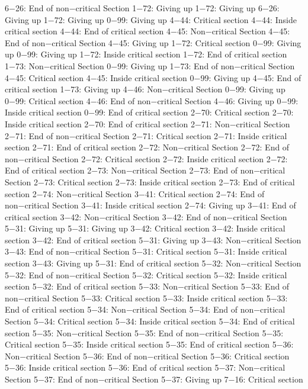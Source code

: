 6−26: End of non−critical Section
1−72: Giving up
1−72: Giving up
6−26: Giving up
1−72: Giving up
0−99: Giving up
4−44: Critical section
4−44: Inside critical section
4−44: End of critical section
4−45: Non−critical Section
4−45: End of non−critical Section
4−45: Giving up
1−72: Critical section
0−99: Giving up
0−99: Giving up
1−72: Inside critical section
1−72: End of critical section
1−73: Non−critical Section
0−99: Giving up
1−73: End of non−critical Section
4−45: Critical section
4−45: Inside critical section
0−99: Giving up
4−45: End of critical section
1−73: Giving up
4−46: Non−critical Section
0−99: Giving up
0−99: Critical section
4−46: End of non−critical Section
4−46: Giving up
0−99: Inside critical section
0−99: End of critical section
2−70: Critical section
2−70: Inside critical section
2−70: End of critical section
2−71: Non−critical Section
2−71: End of non−critical Section
2−71: Critical section
2−71: Inside critical section
2−71: End of critical section
2−72: Non−critical Section
2−72: End of non−critical Section
2−72: Critical section
2−72: Inside critical section
2−72: End of critical section
2−73: Non−critical Section
2−73: End of non−critical Section
2−73: Critical section
2−73: Inside critical section
2−73: End of critical section
2−74: Non−critical Section
3−41: Critical section
2−74: End of non−critical Section
3−41: Inside critical section
2−74: Giving up
3−41: End of critical section
3−42: Non−critical Section
3−42: End of non−critical Section
5−31: Giving up
5−31: Giving up
3−42: Critical section
3−42: Inside critical section
3−42: End of critical section
5−31: Giving up
3−43: Non−critical Section
3−43: End of non−critical Section
5−31: Critical section
5−31: Inside critical section
3−43: Giving up
5−31: End of critical section
5−32: Non−critical Section
5−32: End of non−critical Section
5−32: Critical section
5−32: Inside critical section
5−32: End of critical section
5−33: Non−critical Section
5−33: End of non−critical Section
5−33: Critical section
5−33: Inside critical section
5−33: End of critical section
5−34: Non−critical Section
5−34: End of non−critical Section
5−34: Critical section
5−34: Inside critical section
5−34: End of critical section
5−35: Non−critical Section
5−35: End of non−critical Section
5−35: Critical section
5−35: Inside critical section
5−35: End of critical section
5−36: Non−critical Section
5−36: End of non−critical Section
5−36: Critical section
5−36: Inside critical section
5−36: End of critical section
5−37: Non−critical Section
5−37: End of non−critical Section
5−37: Giving up
7−16: Critical section
